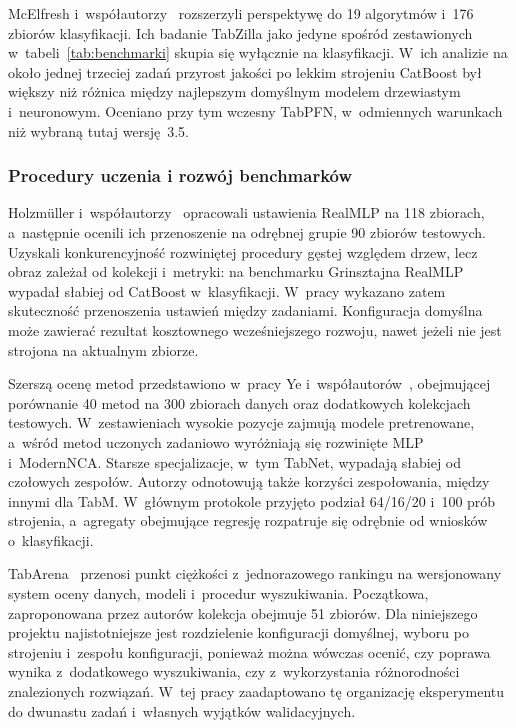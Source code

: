 McElfresh i~współautorzy~\cite{mcelfresh2024tabzilla} rozszerzyli perspektywę do 19 algorytmów i~176 zbiorów klasyfikacji. Ich badanie TabZilla jako jedyne spośród zestawionych w~tabeli~\ref{tab:benchmarki} skupia się wyłącznie na klasyfikacji. W~ich analizie na około jednej trzeciej zadań przyrost jakości po lekkim strojeniu CatBoost był większy niż różnica między najlepszym domyślnym modelem drzewiastym i~neuronowym. Oceniano przy tym wczesny TabPFN, w~odmiennych warunkach niż wybraną tutaj wersję~3.5.

\subsubsection{Procedury uczenia i rozwój benchmarków}

Holzmüller i~współautorzy~\cite{holzmueller2024realmlp} opracowali ustawienia RealMLP na 118 zbiorach, a~następnie ocenili ich przenoszenie na odrębnej grupie 90 zbiorów testowych. Uzyskali konkurencyjność rozwiniętej procedury gęstej względem drzew, lecz obraz zależał od kolekcji i~metryki: na benchmarku Grinsztajna RealMLP wypadał słabiej od CatBoost w~klasyfikacji. W~pracy wykazano zatem skuteczność przenoszenia ustawień między zadaniami. Konfiguracja domyślna może zawierać rezultat kosztownego wcześniejszego rozwoju, nawet jeżeli nie jest strojona na aktualnym zbiorze.

Szerszą ocenę metod przedstawiono w~pracy Ye i~współautorów~\cite{ye2025talent}, obejmującej porównanie 40 metod na 300 zbiorach danych oraz dodatkowych kolekcjach testowych. W~zestawieniach wysokie pozycje zajmują modele pretrenowane, a~wśród metod uczonych zadaniowo wyróżniają się rozwinięte MLP i~ModernNCA. Starsze specjalizacje, w~tym TabNet, wypadają słabiej od czołowych zespołów. Autorzy odnotowują także korzyści zespołowania, między innymi dla TabM. W~głównym protokole przyjęto podział 64/16/20 i~100 prób strojenia, a~agregaty obejmujące regresję rozpatruje się odrębnie od wniosków o~klasyfikacji.

TabArena~\cite{erickson2025tabarena} przenosi punkt ciężkości z~jednorazowego rankingu na wersjonowany system oceny danych, modeli i~procedur wyszukiwania. Początkowa, zaproponowana przez autorów kolekcja obejmuje 51 zbiorów. Dla niniejszego projektu najistotniejsze jest rozdzielenie konfiguracji domyślnej, wyboru po strojeniu i~zespołu konfiguracji, ponieważ można wówczas ocenić, czy poprawa wynika z~dodatkowego wyszukiwania, czy z~wykorzystania różnorodności znalezionych rozwiązań. W~tej pracy zaadaptowano tę organizację eksperymentu do dwunastu zadań i~własnych wyjątków walidacyjnych.

